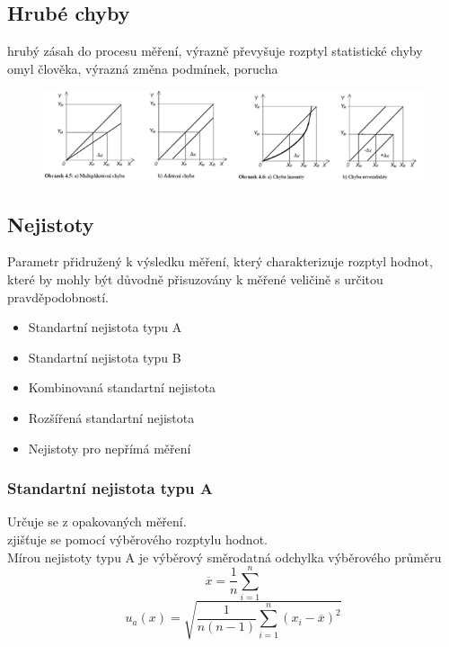 \subsection*{Hrubé chyby}
hrubý zásah do procesu měření, výrazně převyšuje rozptyl statistické chyby \\
omyl člověka, výrazná změna podmínek, porucha\\
\begin{figure}[H]
        \includegraphics{images/chyby.png}

\end{figure}

\subsection*{Nejistoty}
Parametr přidružený k výsledku měření, který charakterizuje rozptyl hodnot, které by mohly být důvodně přisuzovány k měřené veličině s určitou pravděpodobností.\\
\begin{itemize}
    \item Standartní nejistota typu A
    \item Standartní nejistota typu B 
    \item Kombinovaná standartní nejistota
    \item Rozšířená standartní nejistota
    \item Nejistoty pro nepřímá měření
\end{itemize}

\subsubsection*{Standartní nejistota typu A}
Určuje se  z opakovaných měření.\\
zjišťuje se pomocí výběrového rozptylu hodnot.\\
Mírou nejistoty typu A je výběrový směrodatná odchylka výběrového průměru\\
\begin{equation}
    \overline{x} = \frac{1}{n}\sum^n_{i=1}
\end{equation}
\begin{equation}
    u_a(x) = \sqrt{\frac{1}{n(n-1)}\sum^n_{i=1}(x_i-\overline{x})^2}
\end{equation}
\newpage


